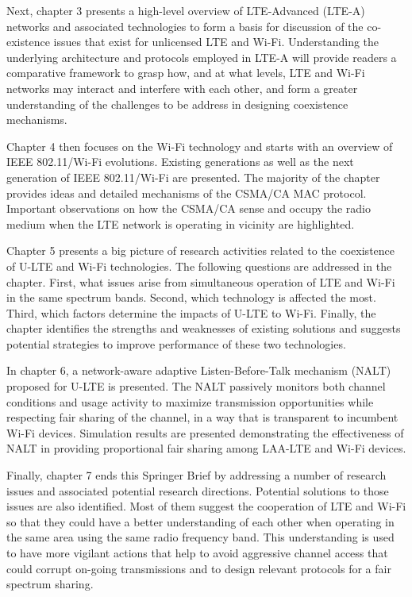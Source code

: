 Next, chapter 3 presents a high-level overview of LTE-Advanced (LTE-A) networks and associated technologies to form a basis for discussion of the co-existence issues that exist for unlicensed LTE and Wi-Fi. Understanding the underlying architecture and protocols employed in LTE-A will provide readers a comparative framework to grasp how, and at what levels, LTE and Wi-Fi networks may interact and interfere with each other, and form a greater understanding of the challenges to be address in designing coexistence mechanisms.

Chapter 4 then focuses on the Wi-Fi technology and starts with an overview of IEEE 802.11/Wi-Fi evolutions. Existing generations as well as the next generation of IEEE 802.11/Wi-Fi are presented. The majority of the chapter provides ideas and detailed mechanisms of the CSMA/CA MAC protocol. Important observations on how the CSMA/CA sense and occupy the radio medium when the LTE network is operating in vicinity are highlighted.

Chapter 5 presents a big picture of research activities related to the coexistence of U-LTE and Wi-Fi technologies. The following questions are addressed in the chapter. First, what issues arise from simultaneous operation of LTE and Wi-Fi in the same spectrum bands. Second, which technology is affected the most. Third, which factors determine the impacts of U-LTE to Wi-Fi. Finally, the chapter identifies the strengths and weaknesses of existing solutions and suggests potential strategies to improve performance of these two technologies.

In chapter 6, a network-aware adaptive Listen-Before-Talk mechanism (NALT) proposed for U-LTE is presented. The NALT passively monitors both channel conditions and usage activity to maximize transmission opportunities while respecting fair sharing of the channel, in a way that is transparent to incumbent Wi-Fi devices. Simulation results are presented demonstrating the effectiveness of NALT in providing proportional fair sharing among LAA-LTE and Wi-Fi devices.

Finally, chapter 7 ends this Springer Brief by addressing a number of research issues and associated potential research directions. Potential solutions to those issues are also identified. Most of them suggest the cooperation of LTE and Wi-Fi so that they could have a better understanding of each other when operating in the same area using the same radio frequency band. This understanding is used to have more vigilant actions that help to avoid aggressive channel access that could corrupt on-going transmissions and to design relevant protocols for a fair spectrum sharing.


